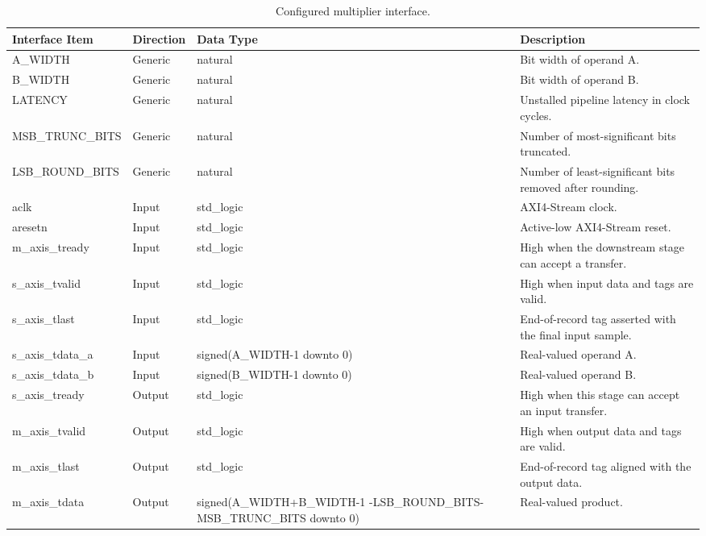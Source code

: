 \begin{table}[H]
\singlespacing
\small
\setlength{\tabcolsep}{2pt}
\renewcommand{\arraystretch}{0.95}
\begin{center}
\caption{Configured multiplier interface.}
\begin{tabularx}{\textwidth}{|L{0.24\textwidth}|L{0.13\textwidth}|L{0.28\textwidth}|Y|}
\hline
\textbf{Interface Item} & \textbf{Direction} & \textbf{Data Type} & \textbf{Description} \\
\hline
A\_WIDTH       & Generic & natural & Bit width of operand A. \\
\hline
B\_WIDTH       & Generic & natural & Bit width of operand B. \\
\hline
LATENCY        & Generic & natural & Unstalled pipeline latency in clock cycles. \\
\hline
MSB\_TRUNC\_BITS & Generic & natural & Number of most-significant bits truncated. \\
\hline
LSB\_ROUND\_BITS & Generic & natural & Number of least-significant bits removed after rounding. \\
\hline
aclk           & Input & std\_logic & AXI4-Stream clock. \\
\hline
aresetn        & Input & std\_logic & Active-low AXI4-Stream reset. \\
\hline
m\_axis\_tready & Input & std\_logic & High when the downstream stage can accept a transfer. \\
\hline
s\_axis\_tvalid & Input & std\_logic & High when input data and tags are valid. \\
\hline
s\_axis\_tlast & Input & std\_logic & End-of-record tag asserted with the final input sample. \\
\hline
s\_axis\_tdata\_a & Input & signed(A\_WIDTH-1 \newline downto 0) & Real-valued operand A.  \\
\hline
s\_axis\_tdata\_b & Input & signed(B\_WIDTH-1 \newline downto 0) & Real-valued operand B.  \\
\hline
s\_axis\_tready & Output & std\_logic & High when this stage can accept an input transfer. \\
\hline
m\_axis\_tvalid & Output & std\_logic & High when output data and tags are valid. \\
\hline
m\_axis\_tlast & Output & std\_logic & End-of-record tag aligned with the output data. \\
\hline
m\_axis\_tdata & Output & signed(\newline A\_WIDTH+B\_WIDTH-1 \newline -LSB\_ROUND\_BITS- \newline MSB\_TRUNC\_BITS downto 0) & Real-valued product. \\
\hline
\end{tabularx}
\end{center}
\end{table}

